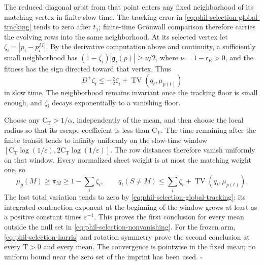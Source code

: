The reduced diagonal orbit from that point enters any fixed neighborhood
of its matching vertex in finite slow time. The tracking error in
\cref{eq:phil-selection-global-tracking} tends to zero after \(t_1\);
finite-time Gr\"onwall comparison therefore carries the evolving rows into
the same neighborhood. At its selected vertex let
\(\zeta_i=|p_i-p_i^M|\). By the derivative computation above and continuity,
a sufficiently small neighborhood has
\((1-\zeta_i)|\mathfrak g_i(p)|\ge\nu/2\), where \(\nu=1-\mathsf r_E>0\), and
the fitness has the sign directed toward that vertex. Thus
\[
 D^+\zeta_i\le-\tfrac\nu2\zeta_i+
                   \operatorname{TV}(q_t,\mu_{p(t)})
\]
in slow time. The neighborhood remains invariant once the tracking floor
is small enough, and \(\zeta_i\) decays exponentially to a vanishing
floor.

Choose any \(\mathrm C_{\mathrm T}>1/\alpha\), independently of the mean,
and then choose the local radius so that its escape coefficient is less
than \(\mathrm C_{\mathrm T}\). The time remaining after the finite
transit tends to infinity uniformly on the slow-time window
\([\mathrm C_{\mathrm T}\log(1/\varepsilon),
  2\mathrm C_{\mathrm T}\log(1/\varepsilon)]\).
The row distances therefore vanish uniformly on that window. Every
normalized sheet weight is at most the matching weight one, so
\[
 \mu_p(M)\ge\pi_M\ge1-\sum_i\zeta_i,
 \qquad
 q_t(S\ne M)\le\sum_i\zeta_i+
                     \operatorname{TV}(q_t,\mu_{p(t)}).
\]
The last total variation tends to zero by
\cref{eq:phil-selection-global-tracking}; its integrated contraction
exponent at the beginning of the window grows at least as a positive
constant times \(\varepsilon^{-1}\).
This proves the first conclusion for every mean outside the null set in
\cref{eq:phil-selection-nonvanishing}. For the frozen arm,
\cref{eq:phil-selection-harris} and rotation symmetry prove the second
conclusion at every \(\mathrm T>0\) and every mean. The convergence is
pointwise in the fixed mean; no uniform bound near the zero set of the
imprint has been used. \(\square\)








